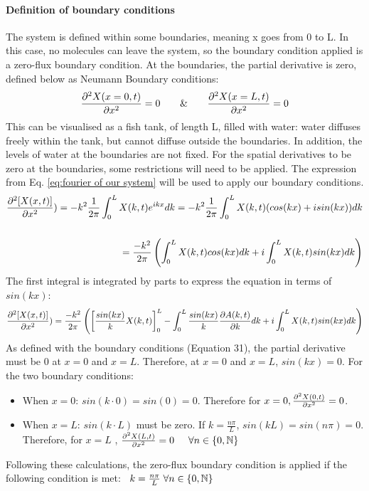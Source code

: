\paragraph{Definition of boundary conditions}
The system is defined within some boundaries, meaning x goes from 0 to L. In this case, no molecules can leave the system, so the boundary condition applied is a zero-flux boundary condition. At the boundaries, the partial derivative is zero, defined below as Neumann Boundary conditions:
\begin{equation}
    \pdv[2]{X(x=0,t)}{x}=0  \hspace{0.5cm}\And  \hspace{0.5cm}\pdv[2]{X(x=L,t)}{x}=0
\end{equation}
This can be visualised as a fish tank, of length L, filled with water: water diffuses freely within the tank, but cannot diffuse outside the boundaries. In addition, the levels of water at the boundaries are not fixed. For the spatial derivatives to be zero at the boundaries, some restrictions will need to be applied. The expression from Eq. \eqref{eq:fourier of our system} will be used to apply our boundary conditions.
\begin{equation}
    \begin{split}
        \pdv[2]{[X(x,t)]}{x}) =  -k^2 \frac{1}{2\pi}\int_{0}^{L} X(k,t)e^{ikx} dk =  -k^2 \frac{1}{2\pi}\int_{0}^{L} X(k,t)(cos(kx)+isin(kx))dk\\\\
        =\frac{-k^2}{2\pi}\left(\int_{0}^{L} X(k,t)cos(kx)dk + i\int_{0}^{L} X(k,t)sin(kx)dk\right)
    \end{split}
\end{equation}
The first integral is integrated by parts to express the equation in terms of $sin(kx)$:
\begin{equation}
    \begin{split}
        \pdv[2]{[X(x,t)]}{x}) = \frac{-k^2}{2\pi}\left(\left[\frac{sin(kx)}{k}X(k,t)\right]^L_{0} - \int_{0}^{L} \frac{sin(kx)}{k}\pdv{A(k,t)}{k}dk + i\int_{0}^{L} X(k,t)sin(kx)dk\right)
    \end{split}
\end{equation}
As defined with the boundary conditions (Equation 31), the partial derivative must be 0 at $x=0$ and  $x=L$. Therefore, at $x=0$ and  $x=L$, $sin(kx)=0$. For the two boundary conditions:
\begin{itemize}
    \item When $x=0$: $sin(k\cdot0)=sin(0)=0$. Therefore for $x=0,\pdv[2]{X(0,t)}{x}=0$.
    \item When $x=L$: $sin(k\cdot L)$ must be zero. If $ k=\frac{n\pi}{L}$, $sin(kL) = sin(n\pi) = 0$. Therefore, for $x=L$ , $\pdv[2]{X(L,t)}{x}=0 \hspace{0.5cm} \forall n \in \{0, \mathbb{N}\} $
\end{itemize}
Following these calculations, the zero-flux boundary condition is applied if the following condition is met:  ~$k=\frac{n\pi}{L} \hspace{0.1cm}\forall n \in \{0, \mathbb{N}\} $

